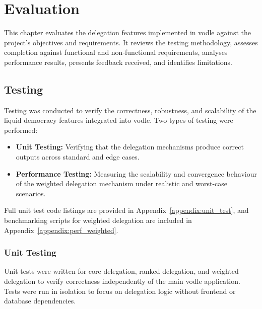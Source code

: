 \chapter{Evaluation}\label{ch:evaluation}

This chapter evaluates the delegation features implemented in vodle against the project's objectives and requirements. It reviews the testing methodology, assesses completion against functional and non-functional requirements, analyses performance results, presents feedback received, and identifies limitations.

\section{Testing}
Testing was conducted to verify the correctness, robustness, and scalability of the liquid democracy features integrated into vodle. Two types of testing were performed:
\begin{itemize}
    \item \textbf{Unit Testing:} Verifying that the delegation mechanisms produce correct outputs across standard and edge cases.
    \item \textbf{Performance Testing:} Measuring the scalability and convergence behaviour of the weighted delegation mechanism under realistic and worst-case scenarios.
\end{itemize}
Full unit test code listings are provided in Appendix~\ref{appendix:unit_test}, and benchmarking scripts for weighted delegation are included in Appendix~\ref{appendix:perf_weighted}.

\subsection{Unit Testing}
Unit tests were written for core delegation, ranked delegation, and weighted delegation to verify correctness independently of the main vodle application. Tests were run in isolation to focus on delegation logic without frontend or database dependencies.

